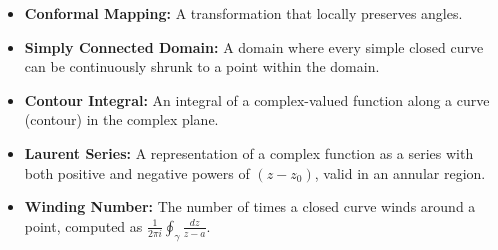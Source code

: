 \begin{itemize}
    \item \textbf{Conformal Mapping:} A transformation that locally preserves angles.
    
    \item \textbf{Simply Connected Domain:} A domain where every simple closed curve can be continuously shrunk to a point within the domain.

    \item \textbf{Contour Integral:} An integral of a complex-valued function along a curve (contour) in the complex plane.

    \item \textbf{Laurent Series:} A representation of a complex function as a series with both positive and negative powers of \( (z - z_0) \), valid in an annular region.

    \item \textbf{Winding Number:} The number of times a closed curve winds around a point, computed as \( \frac{1}{2\pi i}\oint_\gamma \frac{dz}{z-a} \).
\end{itemize}

